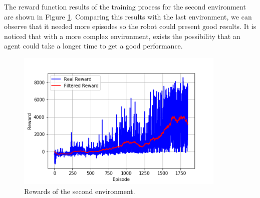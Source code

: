 The reward function results of the training process for the second environment are shown in {\color{blue}Figure} \ref{fig:stage_2}.
Comparing this results with the last environment, we can observe that it needed more episodes so the robot could present good results.
It is noticed that with a more complex environment, exists the possibility that an agent could take a longer time to get a good performance.

\begin{figure}[H]
\centerline{\includegraphics[width=10cm]{images/stage_2.png}}
\caption{Rewards of the second environment.}
\label{fig:stage_2}
\end{figure}




